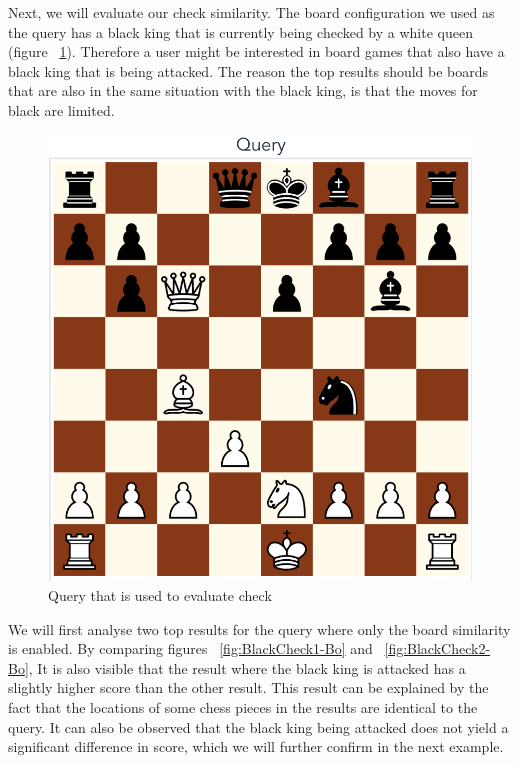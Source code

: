 \documentclass[11pt]{article}
\begin{document}
    Next, we will evaluate our check similarity. The board configuration we used as the query has a black king that is currently being checked by a white queen (figure ~\ref{fig:BlackCheckQuery}). Therefore a user might be interested in board games that also have a black king that is being attacked. The reason the top results should be boards that are also in the same situation with the black king, is that the moves for black are limited.

    \begin{figure}[H]
        \centering
        \includegraphics[width=14cm]{images/QueryBlackCheck}
        \caption{Query that is used to evaluate check}
        \label{fig:BlackCheckQuery}
    \end{figure}

    We will first analyse two top results for the query where only the board similarity is enabled. By comparing figures ~\ref{fig:BlackCheck1-Bo} and ~\ref{fig:BlackCheck2-Bo}, It is also visible that the result where the black king is attacked has a slightly higher score than the other result. This result can be explained by the fact that the locations of some chess pieces in the results are identical to the query. It can also be observed that the black king being attacked does not yield a significant difference in score, which we will further confirm in the next example.
\end{document}
